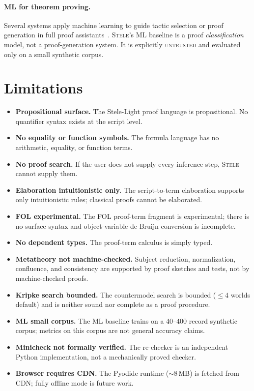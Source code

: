 \documentclass[11pt,a4paper]{article}
\theoremstyle{definition}
\theoremstyle{plain}
\newcommand{\stele}{\textsc{Stele}}
\newcommand{\untrusted}{\textsc{untrusted}}
\begin{document}
\paragraph{ML for theorem proving.}
Several systems apply machine learning to guide tactic selection
or proof generation in full proof assistants~\cite{Yang2023}.
\stele{}'s ML baseline is a proof \emph{classification}
model, not a proof-generation system.
It is explicitly \untrusted{} and evaluated only on a small
synthetic corpus.

\section{Limitations}
\label{sec:limitations}

\begin{itemize}
  \item \textbf{Propositional surface.}
    The Stele-Light proof language is propositional.
    No quantifier syntax exists at the script level.
  \item \textbf{No equality or function symbols.}
    The formula language has no arithmetic, equality, or
    function terms.
  \item \textbf{No proof search.}
    If the user does not supply every inference step, \stele{}
    cannot supply them.
  \item \textbf{Elaboration intuitionistic only.}
    The script-to-term elaboration supports only intuitionistic
    rules; classical proofs cannot be elaborated.
  \item \textbf{FOL experimental.}
    The FOL proof-term fragment is experimental; there is no
    surface syntax and object-variable de Bruijn conversion is
    incomplete.
  \item \textbf{No dependent types.}
    The proof-term calculus is simply typed.
  \item \textbf{Metatheory not machine-checked.}
    Subject reduction, normalization, confluence, and consistency
    are supported by proof sketches and tests, not by
    machine-checked proofs.
  \item \textbf{Kripke search bounded.}
    The countermodel search is bounded (${\le}4$ worlds default)
    and is neither sound nor complete as a proof procedure.
  \item \textbf{ML small corpus.}
    The ML baseline trains on a 40--400 record synthetic corpus;
    metrics on this corpus are not general accuracy claims.
  \item \textbf{Minicheck not formally verified.}
    The re-checker is an independent Python implementation, not
    a mechanically proved checker.
  \item \textbf{Browser requires CDN.}
    The Pyodide runtime (${\sim}$8\,MB) is fetched from CDN;
    fully offline mode is future work.
\end{itemize}
\end{document}
